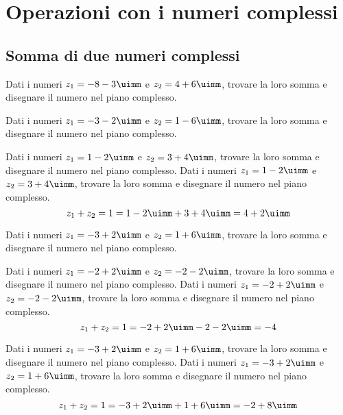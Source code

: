 \chapter{Operazioni con i numeri complessi}
 \section{Somma di due numeri complessi}
  \begin{exercise}[no solution]
 	Dati i numeri $z_1=-8-3\uimm$ e $z_2=4+6\uimm$, trovare la loro somma e  disegnare il numero nel piano complesso.
 \end{exercise}
 \begin{exercise}[no solution]
	Dati i numeri $z_1=-3-2\uimm$ e $z_2=1-6\uimm$, trovare la loro somma e  disegnare il numero nel piano complesso.
\end{exercise}
 \begin{exercise}
Dati i numeri $z_1=1-2\uimm$ e $z_2=3+4\uimm$, trovare la loro somma e  disegnare il numero nel piano complesso.
\tcblower
Dati i numeri $z_1=1-2\uimm$ e $z_2=3+4\uimm$, trovare la loro somma e  disegnare il numero nel piano complesso.
\[z_1+z_2=1=1-2\uimm+3+4\uimm=4+2\uimm \]
\begin{center}

\label{fig:disegnopianocomplesso07}
\end{center}
 \end{exercise}
 \begin{exercise}[no solution]
Dati i numeri $z_1=-3+2\uimm$ e $z_2=1+6\uimm$, trovare la loro somma e  disegnare il numero nel piano complesso.
 \end{exercise}
 \begin{exercise}
 	Dati i numeri $z_1=-2+2\uimm$ e $z_2=-2-2\uimm$, trovare la loro somma e  disegnare il numero nel piano complesso.
 	\tcblower
 	Dati i numeri $z_1=-2+2\uimm$ e $z_2=-2-2\uimm$, trovare la loro somma e  disegnare il numero nel piano complesso.
 \[z_1+z_2=1=-2+2\uimm-2-2\uimm=-4\]
 	\begin{center}
 		
 		\label{fig:disegnopianocomplesso08}
 	\end{center}
 \end{exercise}
 \begin{exercise}
	Dati i numeri $z_1=-3+2\uimm$ e $z_2=1+6\uimm$, trovare la loro somma e  disegnare il numero nel piano complesso.
	\tcblower
	Dati i numeri $z_1=-3+2\uimm$ e $z_2=1+6\uimm$, trovare la loro somma e  disegnare il numero nel piano complesso.
	\[z_1+z_2=1=-3+2\uimm+1+6\uimm=-2+8\uimm \]
	\begin{center}
		
		\label{fig:disegnopianocomplesso16}
	\end{center}
\end{exercise}
